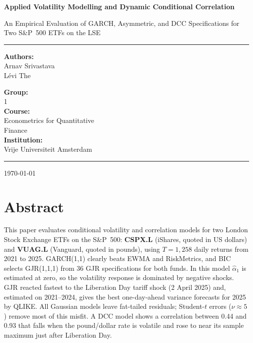 \documentclass[10pt,a4paper]{article}
\begin{document}
\hypersetup{pageanchor=false}
\begin{titlepage}
\centering
\vspace*{3cm}
{\LARGE\bfseries Applied Volatility Modelling and Dynamic Conditional Correlation\par}
\vspace{0.8cm}
{\large An Empirical Evaluation of GARCH, Asymmetric, and DCC Specifications for Two S\&P~500 ETFs on the LSE\par}
\vspace{2.5cm}
\rule{\textwidth}{0.8pt}\par
\vspace{0.4cm}
\begin{minipage}[t]{0.48\textwidth}
\raggedright
\vspace*{1.4cm}
\textbf{Authors:}\\
Arnav Srivastava\\
L\'evi The
\end{minipage}\hfill
\begin{minipage}[t]{0.48\textwidth}
\raggedleft
\textbf{Group:}\\
1\\[0.3cm]
\textbf{Course:}\\
Econometrics for Quantitative\\
Finance\\[0.3cm]
\textbf{Institution:}\\
Vrije Universiteit Amsterdam
\end{minipage}\par
\vspace{0.4cm}
\rule{\textwidth}{0.8pt}\par
\vfill
{\large \today\par}
\end{titlepage}
\hypersetup{pageanchor=true}

\section*{Abstract}
This paper evaluates conditional volatility and correlation models for two London Stock Exchange ETFs
on the S\&P~500: \textbf{CSPX.L} (iShares, quoted in US dollars) and \textbf{VUAG.L} (Vanguard, quoted in
pounds), using $T=1{,}258$ daily returns from 2021 to 2025. GARCH(1,1) clearly beats EWMA and RiskMetrics,
and BIC selects GJR(1,1,1) from 36 GJR specifications for both funds. In this model $\hat\alpha_1$ is estimated at zero, so the volatility
response is dominated by negative shocks. GJR reacted fastest to the Liberation Day tariff shock (2 April 2025) and, estimated
on 2021--2024, gives the best one-day-ahead variance forecasts for 2025 by QLIKE. All Gaussian models leave
fat-tailed residuals; Student-$t$ errors ($\nu\approx5$) remove most of this misfit. A DCC model shows a
correlation between 0.44 and 0.93 that falls when the pound/dollar rate is volatile and rose to near its
sample maximum just after Liberation Day.
\end{document}
